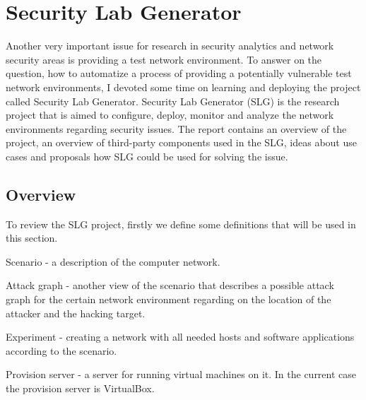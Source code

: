 %


\section{Security Lab Generator}
Another very important issue for research in security analytics and network security areas is providing a test network environment. To answer on the question, how to automatize a process of providing a potentially vulnerable test network environments, I devoted some time on learning and deploying the project called Security Lab Generator. Security Lab Generator (SLG) is the research project that is aimed to configure, deploy, monitor and analyze the network environments regarding security issues. The report contains an overview of the project, an overview of third-party components used in the SLG, ideas about use cases and proposals how SLG could be used for solving the issue.

\subsection{Overview}

To review the SLG project, firstly we define some definitions that will be used in this section. 

\begin{compactitem}
\item Scenario - a description of the computer network. 
\item Attack graph - another view of the scenario that describes a possible attack graph for the certain network environment regarding on the location of the attacker and the hacking target.   
\item Experiment - creating a network with all needed hosts and software applications according to the scenario.
\item Provision server - a server for running virtual machines on it. In the current case the provision server  is VirtualBox.
\end{compactitem}

